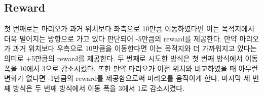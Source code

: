 \subsection{Reward}
\label{sec:exp:reward}
첫 번째로는 마리오가 과거 위치보다 좌측으로 10만큼 이동하였다면 이는 목적지에서 더욱 멀어지는 방향으로 가고 있다 판단되어 -5만큼의 reward를 제공한다. 
만약 마리오가 과거 위치보다 우측으로 10만큼을 이동한다면 이는 목적지와 더 가까워지고 있다는 의미로 +5만큼의 reward를 제공한다. 
두 번째로 시도한 방식은 첫 번째 방식에서 이동 폭을 10에서 3으로 감소시켰다.
또한 만약 마리오가 이전 위치와 비교하였을 때 아무런 변화가 없다면 -1만큼의 reward를 제공함으로써 마리오를 움직이게 한다.
마지막 세 번째 방식은 두 번째 방식에서 이동 폭을 3에서 1로 감소시켰다.
